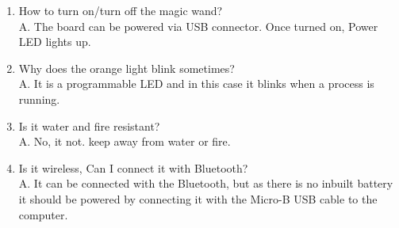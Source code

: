 \begin{enumerate}
		\item How to turn on/turn off the magic wand?\\
	
	A. The board can be powered via USB connector. Once turned on, Power LED lights up.
	
	\item Why does the orange light blink sometimes?\\
	
	A. It is a programmable LED and in this case it blinks when a process is running.\\
	
	\item Is it water and fire resistant?\\
	
	A. No, it not. keep away from water or fire.\\
	
	\item Is it wireless, Can I connect it with Bluetooth?\\
	
	A. It can be connected with the Bluetooth, but as there is no inbuilt battery it should be powered by connecting it with the Micro-B USB cable to the computer.\\
	
	
\end{enumerate}
